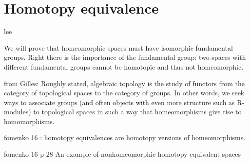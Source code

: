 \section{Homotopy equivalence}

lee

We will prove that homeomorphic spaces must have isomorphic fundamental groups. Right there is the importance of the fundamental group: two spaces with different fundamental groups cannot be homotopic and thus not homeomorphic. 



from Gilles:
Roughly stated, algebraic topology is the study of functors from the category
of topological spaces to the category of groups. In other words, we seek
ways to associate groups (and often objects with even more structure such
as R-modules) to topological spaces in such a way that homeomorphisms
give rise to homomorphisms. 


fomenko 16 : homotopy equivalences are homotopy versions of homeomorphisms.


\begin{example}
    fomenko 16 p 28
    An example of nonhomeomorphic homotopy equivalent spaces
\end{example}